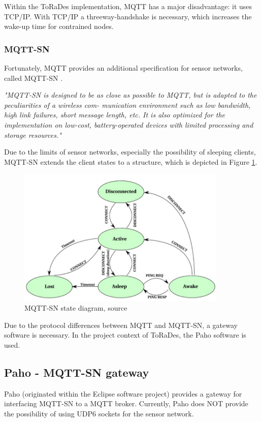 \documentclass[]{scrreprt}%
\begin{document}
Within the ToRaDes implementation, MQTT has a major disadvantage: it uses TCP/IP. With TCP/IP a threeway-handshake is necessary,
which increases the wake-up time for contrained nodes.

\subsubsection{MQTT-SN}

Fortunately, MQTT provides an additional specification for sensor networks, called MQTT-SN \cite{MQ02}.

\textit{"MQTT-SN is designed to be as close as possible to MQTT, but is adapted to the peculiarities of a wireless com-
munication environment such as low bandwidth, high link failures, short message length, etc. It is also optimized
for the implementation on low-cost, battery-operated devices with limited processing and storage resources."}\cite{MQ02}

Due to the limits of sensor networks, especially the possibility of sleeping clients, MQTT-SN extends the client states to a structure, which is depicted
in Figure \ref{img:mqtt-sn-state}.

\begin{figure}[htb]
  \centering
  \label{img:mqtt-sn-state}
  \includegraphics[width=100mm]{img/mqtt-sn-state}
  \caption{MQTT-SN state diagram, source \cite{MQ02}}
\end{figure}

Due to the protocol differences between MQTT and MQTT-SN, a gateway software is necessary.
In the project context of ToRaDes, the Paho software is used.

\subsection{Paho - MQTT-SN gateway}

Paho (originated within the Eclipse software project) provides a gateway for interfacing MQTT-SN to a MQTT broker.
Currently, Paho does NOT provide the possibility of using UDP6 sockets for the sensor network.
\end{document}

